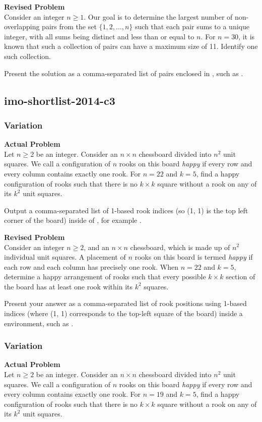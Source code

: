 \textbf{Revised Problem}\\
Consider an integer \( n \geq 1 \). Our goal is to determine the largest number of non-overlapping pairs from the set \(\{1, 2, \ldots, n\}\) such that each pair sums to a unique integer, with all sums being distinct and less than or equal to \( n \). For \( n = 30 \), it is known that such a collection of pairs can have a maximum size of 11. Identify one such collection.

Present the solution as a comma-separated list of pairs enclosed in \boxed, such as .

\subsection{imo-shortlist-2014-c3}
\subsubsection{Variation}
\textbf{Actual Problem}\\
Let $n \geq 2$ be an integer. Consider an $n \times n$ chessboard divided into $n^2$ unit squares.
We call a configuration of $n$ rooks on this board \textit{happy} if every row and every column contains exactly one rook. 
For $n=22$ and $k=5$, find a happy configuration of rooks such that there is no $k \times k$ square without a rook on any of its $k^2$ unit squares.


Output a comma-separated list of 1-based rook indices (so (1, 1) is the top left corner of the board) inside of \boxed, for example .

\textbf{Revised Problem}\\
Consider an integer $n \geq 2$, and an $n \times n$ chessboard, which is made up of $n^2$ individual unit squares. A placement of $n$ rooks on this board is termed \textit{happy} if each row and each column has precisely one rook. When $n=22$ and $k=5$, determine a happy arrangement of rooks such that every possible $k \times k$ section of the board has at least one rook within its $k^2$ squares.

Present your answer as a comma-separated list of rook positions using 1-based indices (where (1, 1) corresponds to the top-left square of the board) inside a \boxed environment, such as .

\subsubsection{Variation}
\textbf{Actual Problem}\\
Let $n \geq 2$ be an integer. Consider an $n \times n$ chessboard divided into $n^2$ unit squares.
We call a configuration of $n$ rooks on this board \textit{happy} if every row and every column contains exactly one rook. 
For $n=19$ and $k=5$, find a happy configuration of rooks such that there is no $k \times k$ square without a rook on any of its $k^2$ unit squares.


